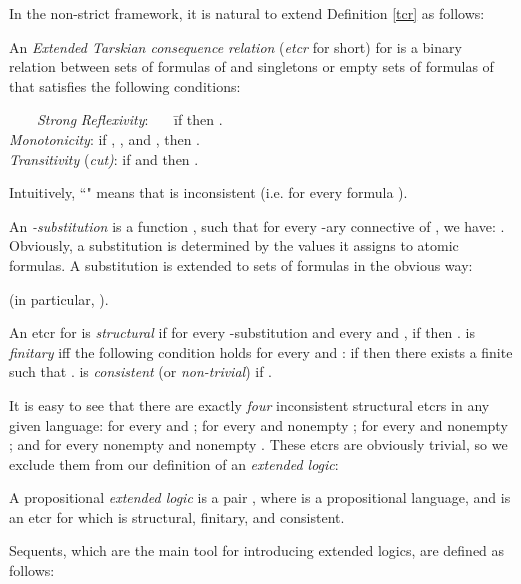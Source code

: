 \documentclass{LMCS}
\theoremstyle{remark}
\begin{document}
\noindent In the non-strict framework, it is natural to extend Definition \ref{tcr} as follows: 

\begin{defi}
\label{etcr}
An {\em Extended Tarskian consequence relation} ({\em etcr} for short) for 
is a binary relation  between sets of formulas of  and singletons or
empty sets of formulas of  that satisfies the following conditions:
\begin{tabbing}
\ \ \ \ \=
 {\it Strong} {\it Reflexivity}: \ \ \ \=
if  then .\\
 \> {\it Monotonicity}: \> if , , and , then . \\
 \> {\it Transitivity} {(\it cut)}:
\> if  and 
then .
\end{tabbing}
\end{defi}

\noindent Intuitively, ``" means that  is inconsistent 
(i.e.  for every formula ). 

\begin{defi}
\label{substitution}
An {\em -substitution} is a function , 
such that for every -ary connective  of , we have:
.
Obviously, a substitution is determined by the values it assigns to atomic formulas.
A substitution is extended to sets of formulas in the obvious way:
 
(in particular, ).
\end{defi}

\begin{defi}
\label{etcr properties}
An etcr  for  is {\it structural} 
if for every -substitution  and every  and , if
 then .
 is {\em finitary} iff the following condition
holds for every  and :
if  then there exists a
finite  such that
.
 is {\em consistent} (or {\em non-trivial})
if .
\end{defi}

It is easy to see that 
there are exactly {\em four} inconsistent structural etcrs 
in any given language:  for every  and ;
 for every  and nonempty ;
 for every  and nonempty ;
and  for every nonempty  and nonempty .
These etcrs are obviously trivial, so we exclude them from
our definition of an {\em extended logic}:

\begin{defi}
\label{elogic}
A propositional {\it extended logic} is a pair ,
where  is a propositional language, and  is
an etcr for  which is structural, finitary, and consistent. 
\end{defi}

Sequents, which are the main tool for introducing extended logics, are defined as follows:
\end{document}
